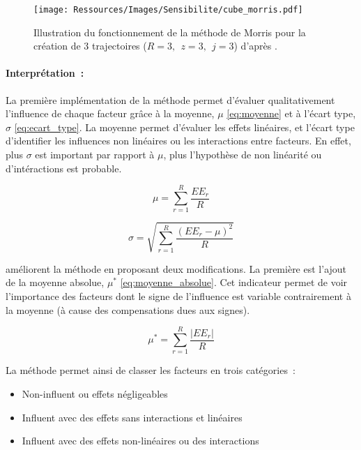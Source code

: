 \begin{figure}
    \centering
    \texttt{[image: Ressources/Images/Sensibilite/cube\_morris.pdf]}
    \caption[Illustration du fonctionnement de la méthode de Morris]
            {Illustration du fonctionnement de la méthode de Morris pour la création
             de 3 trajectoires ($R = 3,~~ z = 3,~~ j = 3$) d’après \textcite{Munaretto2014}.}
    \label{fig:fonctionnement_morris}
\end{figure}

\paragraph{Interprétation~:} %
\label{par:interpretation}
La première implémentation de la méthode permet d’évaluer qualitativement l’influence de
chaque facteur grâce à la moyenne, $\mu$ \eqref{eq:moyenne} et à l’écart type, $\sigma$
\eqref{eq:ecart_type}. La moyenne permet d’évaluer les effets linéaires, et l’écart type
d’identifier les influences non linéaires ou les interactions entre facteurs.
En effet, plus $\sigma$ est important par rapport à $\mu$, plus l’hypothèse de non linéarité
ou d’intéractions est probable.

\begin{equation}\label{eq:moyenne}
    \mu = \sum_{r = 1}^{R} \frac{EE_{r}}{R}
\end{equation}

\begin{equation}\label{eq:ecart_type}
    \sigma = \sqrt{\sum_{r=1}^{R}\frac{(EE_{r} - \mu)^{2}}{R}}
\end{equation}

\textcite{Campolongo20071509} améliorent la méthode en proposant deux modifications. La première
est l’ajout de la moyenne absolue, $\mu^{*}$ \eqref{eq:moyenne_absolue}. Cet indicateur permet
de voir l’importance des facteurs dont le signe de l’influence est variable contrairement à
la moyenne (à cause des compensations dues aux signes).

\begin{equation}\label{eq:moyenne_absolue}
    \mu^{*} = \sum_{r = 1}^{R} \frac{\lvert EE_{r} \rvert}{R}
\end{equation}

\noindent La méthode permet ainsi de classer les facteurs en trois catégories~:
\begin{itemize}
  \item Non-influent ou effets négligeables
  \item Influent avec des effets sans interactions et linéaires
  \item Influent avec des effets non-linéaires ou des interactions
\end{itemize}

